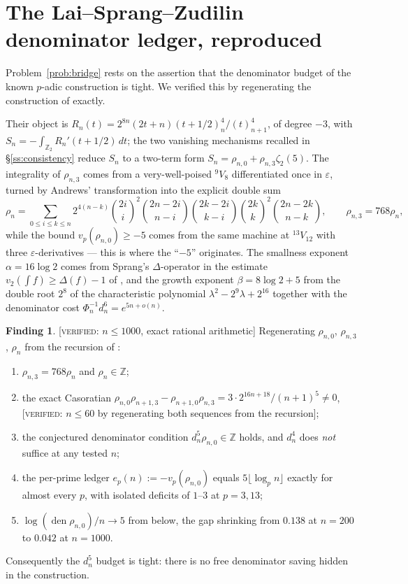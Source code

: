 \documentclass[11pt,reqno]{article}
\newcommand{\ZZ}{\mathbb{Z}}
\newcommand{\vp}{v_p}
\newcommand{\bin}[2]{\binom{#1}{#2}}
\newcommand{\floor}[1]{\lfloor #1 \rfloor}
\newcommand{\VER}[1]{{\normalfont\textsc{[verified:} #1\textsc{]}}}
\theoremstyle{plain}
\theoremstyle{definition}
\newtheorem{finding}[theorem]{Finding}
\theoremstyle{remark}
\numberwithin{equation}{section}
\begin{document}
\section{The Lai--Sprang--Zudilin denominator ledger, reproduced}\label{app:LSZ}

Problem~\ref{prob:bridge} rests on the assertion that the denominator budget of
the known $p$-adic construction is tight.  We verified this by regenerating the
construction of \cite{LSZ2025} exactly.

Their object is $R_n(t)=2^{8n}(2t+n)(t+1/2)_n^4/(t)_{n+1}^4$, of degree $-3$,
with $S_n=-\int_{\ZZ_2}R_n'(t+1/2)\,dt$; the two vanishing mechanisms recalled in
\S\ref{ss:consistency} reduce $S_n$ to a two-term form
$S_n=\rho_{n,0}+\rho_{n,3}\zeta_2(5)$.  The integrality of $\rho_{n,3}$ comes
from a very-well-poised ${}^9V_8$ differentiated once in $\varepsilon$, turned by
Andrews' transformation \cite{KrattenthalerRivoal2007} into the explicit
double sum
\[
  \rho_n=\!\!\sum_{0\le i\le k\le n}\!\!
    2^{4(n-k)}\bin{2i}{i}^2\bin{2n-2i}{n-i}\bin{2k-2i}{k-i}\bin{2k}{k}^2\bin{2n-2k}{n-k},
  \qquad \rho_{n,3}=768\rho_n,
\]
while the bound $\vp(\rho_{n,0})\ge-5$ comes from the same machine at
${}^{13}V_{12}$ with three $\varepsilon$-derivatives --- this is where the
``$-5$'' originates.  The smallness exponent $\alpha=16\log2$ comes from
Sprang's $\Delta$-operator \cite{Sprang2020} in the estimate
$v_2(\int f)\ge\Delta(f)-1$ of \cite[Lemma~2.4]{Lai2025},
and the growth exponent $\beta=8\log2+5$ from the
double root $2^8$ of the characteristic polynomial $\lambda^2-2^9\lambda+2^{16}$
together with the denominator cost $\Phi_n^{-1}d_n^6=e^{5n+o(n)}$.

\begin{finding}\label{find:LSZledger}
\VER{$n\le1000$, exact rational arithmetic}  Regenerating $\rho_{n,0}$,
$\rho_{n,3}$, $\rho_n$ from the recursion of \cite{LSZ2025}:
\begin{enumerate}[label=(\roman*),leftmargin=2em]
\item $\rho_{n,3}=768\rho_n$ and $\rho_n\in\ZZ$;
\item the exact Casoratian
  $\rho_{n,0}\rho_{n+1,3}-\rho_{n+1,0}\rho_{n,3}=3\cdot2^{16n+18}/(n+1)^5\ne0$,
  \VER{$n\le60$ by regenerating both sequences from the recursion};
\item the conjectured denominator condition $d_n^5\rho_{n,0}\in\ZZ$ holds, and
  $d_n^4$ does \emph{not} suffice at any tested $n$;
\item the per-prime ledger $e_p(n):=-\vp(\rho_{n,0})$ equals
  $5\floor{\log_pn}$ exactly for almost every $p$, with isolated deficits of
  $1$--$3$ at $p=3,13$;
\item $\log(\operatorname{den}\rho_{n,0})/n\to5$ from below, the gap shrinking
  from $0.138$ at $n=200$ to $0.042$ at $n=1000$.
\end{enumerate}
Consequently the $d_n^5$ budget is tight: there is no free denominator saving
hidden in the construction.
\end{finding}
\end{document}
